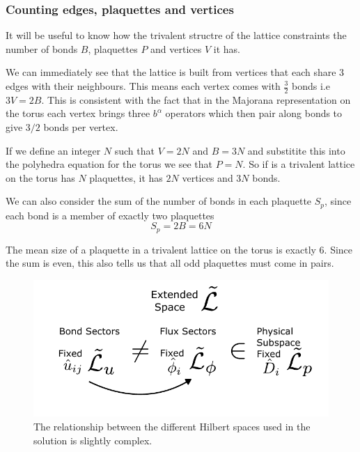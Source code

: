 \hypertarget{counting-edges-plaquettes-and-vertices}{%
\subsubsection{Counting edges, plaquettes and
vertices}\label{counting-edges-plaquettes-and-vertices}}

It will be useful to know how the trivalent structre of the lattice
constraints the number of bonds \(B\), plaquettes \(P\) and vertices
\(V\) it has.

We can immediately see that the lattice is built from vertices that each
share 3 edges with their neighbours. This means each vertex comes with
\(\tfrac{3}{2}\) bonds i.e \(3V = 2B\). This is consistent with the fact
that in the Majorana representation on the torus each vertex brings
three \(b^\alpha\) operators which then pair along bonds to give \(3/2\)
bonds per vertex.

If we define an integer \(N\) such that \(V = 2N\) and \(B = 3N\) and
substitite this into the polyhedra equation for the torus we see that
\(P = N\). So if is a trivalent lattice on the torus has \(N\)
plaquettes, it has \(2N\) vertices and \(3N\) bonds.

We can also consider the sum of the number of bonds in each plaquette
\(S_p\), since each bond is a member of exactly two plaquettes
\[S_p = 2B = 6N\]

The mean size of a plaquette in a trivalent lattice on the torus is
exactly 6. Since the sum is even, this also tells us that all odd
plaquettes must come in pairs.

\begin{figure}
\hypertarget{fig:hilbert_spaces}{%
\centering
\includegraphics{figure_code/amk_chapter/hilbert_spaces.pdf}
\caption{The relationship between the different Hilbert spaces used in
the solution is slightly complex.}\label{fig:hilbert_spaces}
}
\end{figure}

